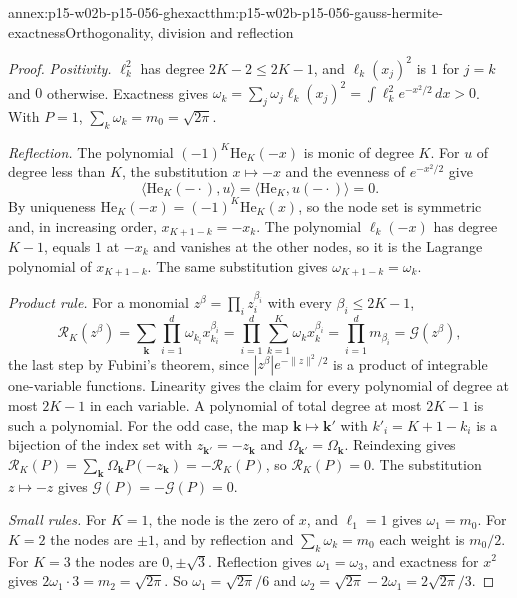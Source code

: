 \begin{annexitem}{annex:p15-w02b-p15-056-ghexact}{thm:p15-w02b-p15-056-gauss-hermite-exactness}{Orthogonality, division and reflection}
\begin{proof}
\emph{Positivity.} \(\ell_k^2\) has degree \(2K-2\leq2K-1\), and
\(\ell_k(x_j)^2\) is \(1\) for \(j=k\) and \(0\) otherwise. Exactness gives
\(\omega_k=\sum_j\omega_j\ell_k(x_j)^2=\int\ell_k^2e^{-x^2/2}\,dx>0\).
With \(P=1\), \(\sum_k\omega_k=m_0=\sqrt{2\pi}\).

\emph{Reflection.} The polynomial \((-1)^K\mathrm{He}_K(-x)\) is monic of
degree \(K\). For \(u\) of degree less than \(K\), the substitution
\(x\mapsto-x\) and the evenness of \(e^{-x^2/2}\) give
\[
 \langle\mathrm{He}_K(-\cdot),u\rangle=\langle\mathrm{He}_K,u(-\cdot)\rangle=0 .
\]
By uniqueness \(\mathrm{He}_K(-x)=(-1)^K\mathrm{He}_K(x)\), so the node set
is symmetric and, in increasing order, \(x_{K+1-k}=-x_k\). The polynomial
\(\ell_k(-x)\) has degree \(K-1\), equals \(1\) at \(-x_k\) and vanishes at
the other nodes, so it is the Lagrange polynomial of \(x_{K+1-k}\). The
same substitution gives \(\omega_{K+1-k}=\omega_k\).

\emph{Product rule.} For a monomial \(z^\beta=\prod_iz_i^{\beta_i}\) with
every \(\beta_i\leq2K-1\),
\[
 \mathcal R_K(z^\beta)=\sum_{\mathbf k}\prod_{i=1}^d\omega_{k_i}x_{k_i}^{\beta_i}
 =\prod_{i=1}^d\sum_{k=1}^K\omega_kx_k^{\beta_i}
 =\prod_{i=1}^dm_{\beta_i}=\mathcal G(z^\beta),
\]
the last step by Fubini's theorem, since
\(|z^\beta|e^{-\|z\|^2/2}\) is a product of integrable one-variable
functions. Linearity gives the claim for every polynomial of degree at
most \(2K-1\) in each variable. A polynomial of total degree at most
\(2K-1\) is such a polynomial. For the odd case, the map
\(\mathbf k\mapsto\mathbf k'\) with \(k'_i=K+1-k_i\) is a bijection of the
index set with \(z_{\mathbf k'}=-z_{\mathbf k}\) and
\(\Omega_{\mathbf k'}=\Omega_{\mathbf k}\). Reindexing gives
\(\mathcal R_K(P)=\sum_{\mathbf k}\Omega_{\mathbf k}P(-z_{\mathbf k})
=-\mathcal R_K(P)\), so \(\mathcal R_K(P)=0\). The substitution
\(z\mapsto-z\) gives \(\mathcal G(P)=-\mathcal G(P)=0\).

\emph{Small rules.} For \(K=1\), the node is the zero of \(x\), and
\(\ell_1=1\) gives \(\omega_1=m_0\). For \(K=2\) the nodes are \(\pm1\),
and by reflection and \(\sum_k\omega_k=m_0\) each weight is \(m_0/2\). For
\(K=3\) the nodes are \(0,\pm\sqrt3\). Reflection gives
\(\omega_1=\omega_3\), and exactness for \(x^2\) gives
\(2\omega_1\cdot3=m_2=\sqrt{2\pi}\). So \(\omega_1=\sqrt{2\pi}/6\) and
\(\omega_2=\sqrt{2\pi}-2\omega_1=2\sqrt{2\pi}/3\).
\end{proof}
\end{annexitem}

